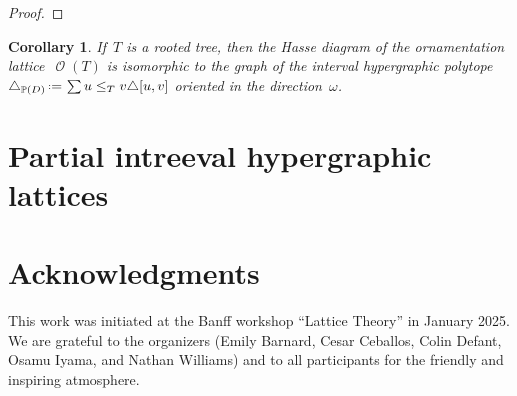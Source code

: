 \documentclass{amsart}
\newtheorem{corollary}[theorem]{Corollary}
\theoremstyle{definition}
\renewcommand{\c}[1]{\mathcal{#1}} %
\newcommand{\eqdef}{\mbox{\,\raisebox{0.2ex}{\scriptsize\ensuremath{\mathrm:}}\ensuremath{=}\,}} %
\newcommand{\simplex}{\triangle} %
\DeclareMathOperator{\Orn}{\c{O}}  %
\newcommand{\PP}{\mathbb P} %
\begin{document}
\begin{proof}
\end{proof}

\begin{corollary}
If~$T$ is a rooted tree, then the Hasse diagram of the ornamentation lattice~$\Orn(T)$ is isomorphic to the graph of the interval hypergraphic polytope~$\simplex_{\PP(D)} \eqdef \sum{u \le_T v} \simplex{[u,v]}$ oriented in the direction~$\omega$.
\end{corollary}



\section{Partial intreeval hypergraphic lattices}
\label{sec:partialIntreevalHypergraphicPosets}


\section*{Acknowledgments}

This work was initiated at the Banff workshop ``Lattice Theory'' in January 2025.
We are grateful to the organizers (Emily Barnard, Cesar Ceballos, Colin Defant, Osamu Iyama, and Nathan Williams) and to all participants for the friendly and inspiring atmosphere.




\label{sec:biblio}

\end{document}
